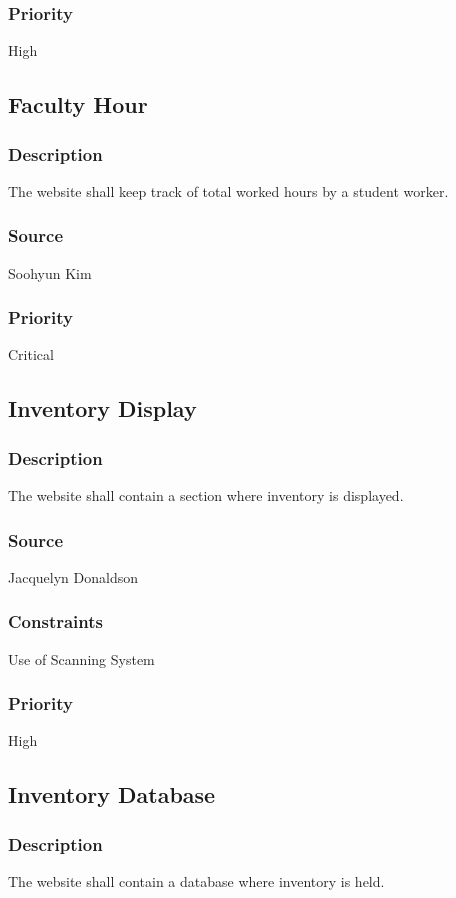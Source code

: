 \subsubsection{Priority}
High

\subsection{Faculty Hour}
\subsubsection{Description}
The website shall keep track of total worked hours by a student worker.
\subsubsection{Source}
Soohyun Kim
\subsubsection{Priority}
Critical

\subsection{Inventory Display}
\subsubsection{Description}
The website shall contain a section where inventory is displayed.
\subsubsection{Source}
Jacquelyn Donaldson
\subsubsection{Constraints}
Use of Scanning System
\subsubsection{Priority}
High

\subsection{Inventory Database}
\subsubsection{Description}
The website shall contain a database where inventory is held.
